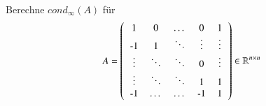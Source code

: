 \begin{exercise}

Berechne $cond_\infty(A)$ für
\begin{equation*}
A = \left(
\begin{tabular}{ccccc}
1 & 0 & $\dots$ & 0 & 1 \\
-1 & 1 & $\ddots$ & $\vdots$ & $\vdots$ \\
$\vdots$ & $\ddots$ & $\ddots$ & 0 & $\vdots$ \\
$\vdots$ & $\ddots$ & $\ddots$ & 1 & 1 \\
-1 & $\dots$ & $\dots$ & -1 & 1 \\
\end{tabular}
\right) \in \R^{n\times n}
\end{equation*}
\end{exercise}

